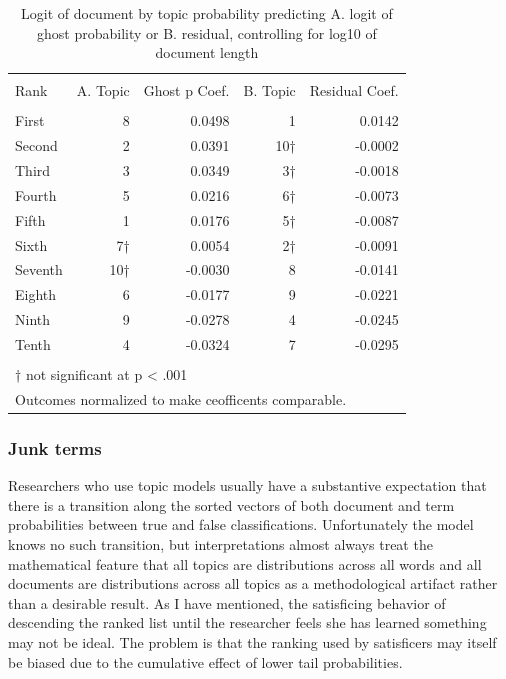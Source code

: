\documentclass[]{book}
\theoremstyle{definition}
\theoremstyle{definition}
\theoremstyle{definition}
\theoremstyle{remark}
\begin{document}
\begin{table}[!htbp] \centering 
  \caption{Logit of document by topic probability predicting A. logit of ghost probability or B. residual, controlling for log10 of document length} 
  \label{tab:Kghost} 
\begin{tabular}{@{\extracolsep{5pt}} lrrrr} 
\\[-1.8ex]\hline 
\hline \\[-1.8ex] 
Rank & A. Topic & Ghost p Coef. & B. Topic & Residual Coef. \\ 
\hline \\[-1.8ex] 
First & 8 &  0.0498 & 1 &  0.0142 \\ 
Second & 2 &  0.0391 & 10† & -0.0002 \\ 
Third & 3 &  0.0349 & 3† & -0.0018 \\ 
Fourth & 5 &  0.0216 & 6† & -0.0073 \\ 
Fifth & 1 &  0.0176 & 5† & -0.0087 \\ 
Sixth & 7† &  0.0054 & 2† & -0.0091 \\ 
Seventh & 10† & -0.0030 & 8 & -0.0141 \\ 
Eighth & 6 & -0.0177 & 9 & -0.0221 \\ 
Ninth & 9 & -0.0278 & 4 & -0.0245 \\ 
Tenth & 4 & -0.0324 & 7 & -0.0295 \\ 
\hline \\[-1.8ex] 
\multicolumn{5}{l}{† not significant at p < .001} \\ 
\multicolumn{5}{l}{Outcomes normalized to make ceofficents comparable.} \\ 
\end{tabular} 
\end{table}

\hypertarget{junk-terms}{%
\subsubsection{Junk terms}\label{junk-terms}}

Researchers who use topic models usually have a substantive expectation
that there is a transition along the sorted vectors of both document and
term probabilities between true and false classifications. Unfortunately
the model knows no such transition, but interpretations almost always
treat the mathematical feature that all topics are distributions across
all words and all documents are distributions across all topics as a
methodological artifact rather than a desirable result. As I have
mentioned, the satisficing behavior of descending the ranked list until
the researcher feels she has learned something may not be ideal. The
problem is that the ranking used by satisficers may itself be biased due
to the cumulative effect of lower tail probabilities.
\end{document}
